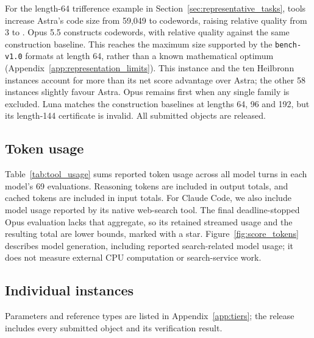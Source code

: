For the length-64 trifference example in Section~\ref{sec:representative_tasks}, tools increase Astra's code size from 59,049 to \ToolTriWords{} codewords, raising relative quality from 3 to \ToolTriRatio{}. Opus 5.5 constructs \OpusToolTriWords{} codewords, with relative quality \OpusToolTriRatio{} against the same construction baseline. This reaches the maximum size supported by the \texttt{bench-v1.0} formats at length 64, rather than a known mathematical optimum (Appendix~\ref{app:representation_limits}). This instance and the ten Heilbronn instances account for more than its net score advantage over Astra; the other 58 instances slightly favour Astra. Opus remains first when any single family is excluded. Luna matches the construction baselines at lengths 64, 96 and 192, but its length-144 certificate is invalid. All submitted objects are released.

\subsection{Token usage}
Table~\ref{tab:tool_usage} sums reported token usage across all model turns in each model's 69 evaluations. Reasoning tokens are included in output totals, and cached tokens are included in input totals. For Claude Code, we also include model usage reported by its native web-search tool. The final deadline-stopped Opus evaluation lacks that aggregate, so its retained streamed usage and the resulting total are lower bounds, marked with a star. Figure~\ref{fig:score_tokens} describes model generation, including reported search-related model usage; it does not measure external CPU computation or search-service work.
\begin{center}\small

\label{tab:tool_usage}
\end{center}

\clearpage
\subsection{Individual instances}
Parameters and reference types are listed in Appendix~\ref{app:tiers}; the release includes every submitted object and its verification result.
\small\setlength{\tabcolsep}{2pt}

\normalsize
